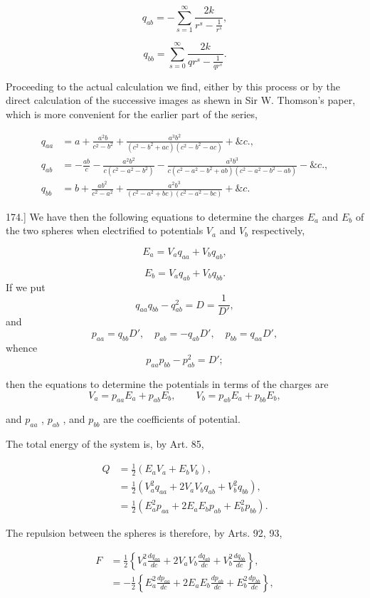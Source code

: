 \documentclass[11pt,a4paper]{article}
\begin{document}
\[
q_{ab}=-\sum_{s=1}^{\infty}\frac{2k}{r^s-\frac{1}{r^s}},
\]

\[
q_{bb}=\sum_{s=0}^{\infty}\frac{2k}{qr^s-\frac{1}{qr^s}}.
\]

Proceeding to the actual calculation we find, either by this process or
by the direct calculation of the successive images as shewn in Sir W.
Thomson's paper, which is more convenient for the earlier part of the
series,

\[
\begin{aligned}
q_{aa} &= a+\frac{a^2b}{c^2-b^2}
 +\frac{a^3b^2}{(c^2-b^2+ac)(c^2-b^2-ac)}+\&c.,\\
q_{ab} &= -\frac{ab}{c}-\frac{a^2b^2}{c(c^2-a^2-b^2)}
 -\frac{a^3b^3}{c(c^2-a^2-b^2+ab)(c^2-a^2-b^2-ab)}-\&c.,\\
q_{bb} &= b+\frac{ab^2}{c^2-a^2}
 +\frac{a^2b^3}{(c^2-a^2+bc)(c^2-a^2-bc)}+\&c.
\end{aligned}
\]

174.] We have then the following equations to determine the charges
$E_a$ and $E_b$ of the two spheres when electrified to potentials
$V_a$ and $V_b$ respectively,

\[
E_a = V_a q_{aa} + V_b q_{ab},
\]

\[
E_b = V_a q_{ab} + V_b q_{bb}.
\]
If we put 
\[
q_{aa} q_{bb} - q_{ab}^2 = D = \frac{1}{D'},
\]
and 
\[
p_{aa} = q_{bb} D', \quad p_{ab} = -q_{ab} D', \quad p_{bb} = q_{aa} D',
\]
whence 
\[
p_{aa} p_{bb} - p_{ab}^2 = D';
\]

then the equations to determine the potentials in terms of the charges
are
\[
V_a=p_{aa}E_a+p_{ab}E_b,\qquad
V_b=p_{ab}E_a+p_{bb}E_b,
\]

and  $p_{aa}$ ,  $p_{ab}$ , and  $p_{bb}$  are the coefficients of potential.

The total energy of the system is, by Art. 85,

\[
\begin{aligned}
Q &= \frac{1}{2}(E_aV_a+E_bV_b),\\
  &= \frac{1}{2}(V_a^2q_{aa}+2V_aV_bq_{ab}+V_b^2q_{bb}),\\
  &= \frac{1}{2}(E_a^2p_{aa}+2E_aE_bp_{ab}+E_b^2p_{bb}).
\end{aligned}
\]

The repulsion between the spheres is therefore, by Arts. 92, 93,

\[
\begin{aligned}
F &= \frac{1}{2}\left\{
V_a^2\frac{dq_{aa}}{dc}+2V_aV_b\frac{dq_{ab}}{dc}
  +V_b^2\frac{dq_{bb}}{dc}\right\},\\
  &= -\frac{1}{2}\left\{
E_a^2\frac{dp_{aa}}{dc}+2E_aE_b\frac{dp_{ab}}{dc}
  +E_b^2\frac{dp_{bb}}{dc}\right\},
\end{aligned}
\]
\end{document}
